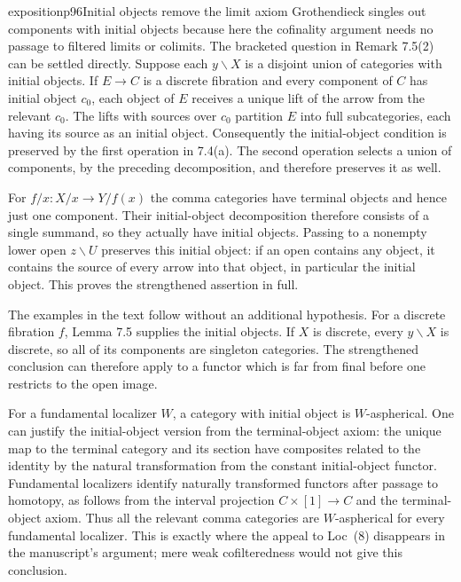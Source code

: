 \clearpage
{}


\begin{dcomment}{exposition}{p96}{Initial objects remove the limit axiom}
Grothendieck singles out components with initial objects because here the cofinality argument needs no passage to filtered limits or colimits. The bracketed question in Remark 7.5(2) can be settled directly. Suppose each $y\backslash X$ is a disjoint union of categories with initial objects. If $E\to C$ is a discrete fibration and every component of $C$ has initial object $c_0$, each object of $E$ receives a unique lift of the arrow from the relevant $c_0$. The lifts with sources over $c_0$ partition $E$ into full subcategories, each having its source as an initial object. Consequently the initial-object condition is preserved by the first operation in 7.4(a). The second operation selects a union of components, by the preceding decomposition, and therefore preserves it as well.

For $f/x:X/x\to Y/f(x)$ the comma categories have terminal objects and hence just one component. Their initial-object decomposition therefore consists of a single summand, so they actually have initial objects. Passing to a nonempty lower open $z\backslash U$ preserves this initial object: if an open contains any object, it contains the source of every arrow into that object, in particular the initial object. This proves the strengthened assertion in full.

The examples in the text follow without an additional hypothesis. For a discrete fibration $f$, Lemma 7.5 supplies the initial objects. If $X$ is discrete, every $y\backslash X$ is discrete, so all of its components are singleton categories. The strengthened conclusion can therefore apply to a functor which is far from final before one restricts to the open image.

For a fundamental localizer $W$, a category with initial object is $W$-aspherical. One can justify the initial-object version from the terminal-object axiom: the unique map to the terminal category and its section have composites related to the identity by the natural transformation from the constant initial-object functor. Fundamental localizers identify naturally transformed functors after passage to homotopy, as follows from the interval projection $C\times[1]\to C$ and the terminal-object axiom. Thus all the relevant comma categories are $W$-aspherical for every fundamental localizer. This is exactly where the appeal to Loc~(8) disappears in the manuscript's argument; mere weak cofilteredness would not give this conclusion.


\end{dcomment}
